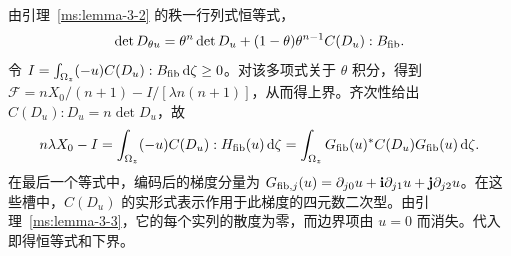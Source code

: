 由引理~\ref{ms:lemma-3-2} 的秩一行列式恒等式，
\[
 \det D_{\theta u}
 =\theta^n\det D_u+(1-\theta)\theta^{n-1}C(D_u):B_{\rm fib}.
\]
令 $I=\int_{\Omega_z}(-u)C(D_u):B_{\rm fib}\,\mathrm d\zeta\ge0$。对该多项式关于 $\theta$ 积分，得到 $\mathcal F=nX_0/(n+1)-I/[\lambda n(n+1)]$，从而得上界。齐次性给出 $C(D_u):D_u=n\det D_u$，故
\[
 n\lambda X_0-I=\int_{\Omega_z}(-u)C(D_u):H_{\rm fib}(u)\,\mathrm d\zeta
 =\int_{\Omega_z}G_{\rm fib}(u)^*C(D_u)G_{\rm fib}(u)\,\mathrm d\zeta.
\]
在最后一个等式中，编码后的梯度分量为 $G_{{\rm fib},j}(u)=\partial_{j0}u+\mathbf i\partial_{j1}u+\mathbf j\partial_{j2}u$。在这些槽中，$C(D_u)$ 的实形式表示作用于此梯度的四元数二次型。由引理~\ref{ms:lemma-3-3}，它的每个实列的散度为零，而边界项由 $u=0$ 而消失。代入即得恒等式和下界。
